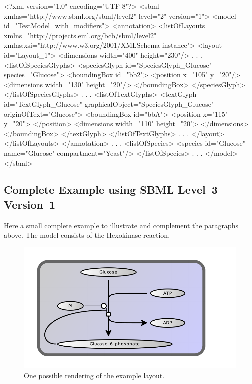 \begin{example}
<?xml version="1.0" encoding="UTF-8"?>
<sbml xmlns="http://www.sbml.org/sbml/level2" level="2" version="1">
  <model id="TestModel_with_modifiers">
    <annotation>
     <listOfLayouts xmlns="http://projects.eml.org/bcb/sbml/level2"
              xmlns:xsi="http://www.w3.org/2001/XMLSchema-instance">
      <layout id="Layout_1">
        <dimensions width="400" height="230"/>
                .
                .
                .
        <listOfSpeciesGlyphs>
          <speciesGlyph id="SpeciesGlyph_Glucose" species="Glucose">
            <boundingBox id="bb2">
              <position x="105" y="20"/>
              <dimensions width="130" height="20"/>
            </boundingBox>
          </speciesGlyph>
        </listOfSpeciesGlyphs>  
                .
                .
                .
        <listOfTextGlyphs>
          <textGlyph id="TextGlyph_Glucose" graphicalObject="SpeciesGlyph_Glucose"
                     originOfText="Glucose">
            <boundingBox id="bbA">
              <position x="115" y="20">
              </position>
              <dimensions width="110" height="20">
              </dimensions>
            </boundingBox>
          </textGlyph>
        </listOfTextGlyphs>  
            .
            .
            .
      </layout>
     </listOfLayouts>
    </annotation>    
         .
         .
         .
    <listOfSpecies>
      <species id="Glucose" name="Glucose" compartment="Yeast"/>
    </listOfSpecies>
       .
       .
       .  
  </model>
</sbml>
\end{example}

\subsection{Complete Example using SBML Level~3 Version~1}
Here a small complete example to illustrate and complement the 
paragraphs above. The model consists of the Hexokinase reaction. 


\begin{center}
\begin{figure}[h!]
\includegraphics{figures/layout-spec-example}
\caption{One possible rendering of the example layout.}
\end{figure}
\end{center}

